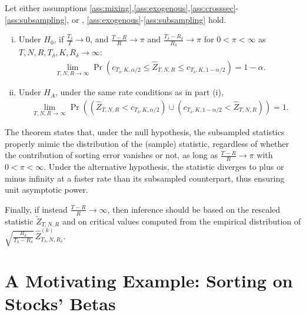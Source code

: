 \begin{theorem}
\label{th:subsampling}

Let either assumptions \ref{ass:mixing},\ref{ass:exogenous},\ref{ass:crosssec}-\ref{ass:subsampling}, or , \ref{ass:exogenous}-\ref{ass:subsampling} hold.

\begin{enumerate}[(i)]
\item Under $H_{0}$, if $\frac{T_\delta}{T}\rightarrow 0$, and $\frac{T-R}{R}\rightarrow \pi$ and $\frac{T_\delta-R_\delta}{R_\delta}\rightarrow \pi$ for $0<\pi<\infty$ as $T,N,R,T_\delta,K,R_\delta\rightarrow \infty$:
\begin{align*}
    \lim_{T,N,R\rightarrow \infty }\Pr \left( c_{T_\delta,K,\alpha/2}\leq \widehat{Z}_{T,N,R}\leq c_{T_\delta,K,1-\alpha/2}\right) = 1-\alpha.
\end{align*}
\item Under $H_{A}$, under the same rate conditions as in part (i),
\begin{align*}
    \lim_{T,N,R\rightarrow \infty }\Pr \left( \left( \widehat{Z}_{T,N,R}<c_{T_\delta,K,\alpha/2}\right) \cup \left( c_{T_\delta,K,1-\alpha/2} < \widehat{Z}_{T,N,R}\right) \right) = 1.
\end{align*}
\end{enumerate}

\end{theorem}


\noindent
The theorem states that, under the null hypothesis, the subsampled statistics properly mimic the distribution of the (sample) statistic, regardless of whether the contribution of sorting error vanishes or not, as long as $\frac{T-R}{R}\rightarrow \pi$ with $0<\pi<\infty$. Under the alternative hypothesis, the statistic diverges to plus or minus infinity at a faster rate than its subsampled counterpart, thus ensuring unit asymptotic power.

Finally, if instead $\frac{T-R}{R}\rightarrow \infty$, then inference should be based on the rescaled statistic $\widetilde{Z}_{T,N,R}$ and on critical values computed from the empirical distribution of $\sqrt{\frac{R_\delta}{T_\delta-R_\delta}}\,\widehat{Z}_{T_\delta,N,R_\delta}^{(k)}$.



\section{A Motivating Example: Sorting on Stocks' Betas}

